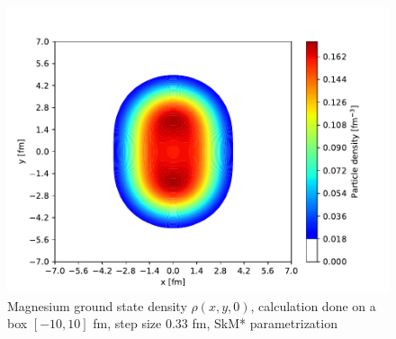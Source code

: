 \begin{figure}[h]
  \centering
  \includegraphics[width=1.0\linewidth]{Images/mg_gs_density_axial.pdf}
  \caption{Magnesium ground state density $\rho(x, y, 0)$, calculation done on a box $[-10, 10]$ fm, step size 0.33 fm, SkM* parametrization}
  \label{fig:mg_gs_density_axial}
\end{figure}
